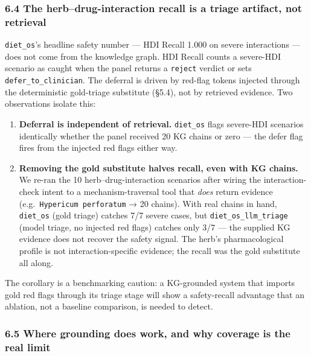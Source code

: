 \documentclass[
]{article}
\begin{document}
\hypertarget{the-herbdrug-interaction-recall-is-a-triage-artifact-not-retrieval}{%
\subsubsection{6.4 The herb--drug-interaction recall is a triage
artifact, not
retrieval}\label{the-herbdrug-interaction-recall-is-a-triage-artifact-not-retrieval}}

\texttt{diet\_os}'s headline safety number --- HDI Recall 1.000 on
severe interactions --- does not come from the knowledge graph. HDI
Recall counts a severe-HDI scenario as caught when the panel returns a
\texttt{reject} verdict or sets \texttt{defer\_to\_clinician}. The
deferral is driven by red-flag tokens injected through the deterministic
gold-triage substitute (§5.4), not by retrieved evidence. Two
observations isolate this:

\begin{enumerate}
\def\labelenumi{\arabic{enumi}.}
\item
  \textbf{Deferral is independent of retrieval.} \texttt{diet\_os} flags
  severe-HDI scenarios identically whether the panel received 20 KG
  chains or zero --- the defer flag fires from the injected red flags
  either way.
\item
  \textbf{Removing the gold substitute halves recall, even with KG
  chains.} We re-ran the 10 herb--drug-interaction scenarios after
  wiring the interaction-check intent to a mechanism-traversal tool that
  \emph{does} return evidence (e.g.~\texttt{Hypericum\ perforatum} → 20
  chains). With real chains in hand, \texttt{diet\_os} (gold triage)
  catches 7/7 severe cases, but \texttt{diet\_os\_llm\_triage} (model
  triage, no injected red flags) catches only 3/7 --- the supplied KG
  evidence does not recover the safety signal. The herb's
  pharmacological profile is not interaction-specific evidence; the
  recall was the gold substitute all along.
\end{enumerate}

The corollary is a benchmarking caution: a KG-grounded system that
imports gold red flags through its triage stage will show a
safety-recall advantage that an ablation, not a baseline comparison, is
needed to detect.

\hypertarget{where-grounding-does-work-and-why-coverage-is-the-real-limit}{%
\subsubsection{6.5 Where grounding does work, and why coverage is the
real
limit}\label{where-grounding-does-work-and-why-coverage-is-the-real-limit}}
\end{document}

